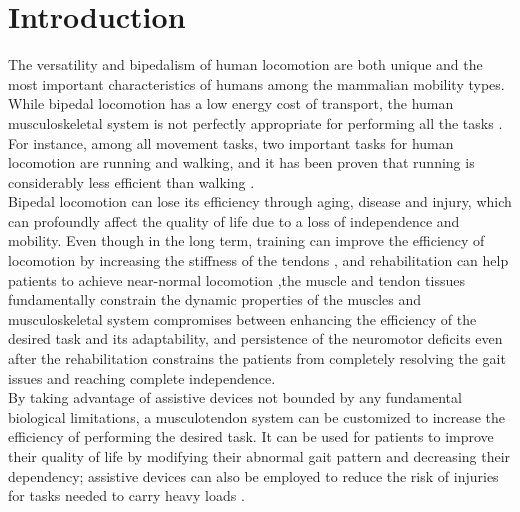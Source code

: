 \documentclass[10pt,letterpaper]{article}
\begin{document}
\section*{Introduction}
The versatility and bipedalism of human locomotion are both unique\cite{1} and the most important characteristics of humans among the mammalian mobility types. While bipedal locomotion has a low energy cost of transport\cite{1}, the human musculoskeletal system is not perfectly appropriate for performing all the tasks \cite{2}. For instance, among all movement tasks, two important tasks for human locomotion are running and walking, and it has been proven that running is considerably less efficient than walking \cite{3,4}.\\
Bipedal locomotion can lose its efficiency through aging, disease and injury, which can profoundly affect the quality of life \cite{7} due to a loss of independence and mobility. Even though in the long term, training can improve the efficiency of locomotion\cite{5} by increasing the stiffness of the tendons \cite{6}, and rehabilitation can help patients to achieve near-normal locomotion \cite{22},the muscle and tendon tissues fundamentally constrain the dynamic properties of the muscles and musculoskeletal system compromises between enhancing the efficiency of the desired task and its adaptability\cite{2}, and persistence of the neuromotor deficits even after the rehabilitation constrains \cite{22} the patients from completely resolving the gait issues and reaching complete independence.\\
By taking advantage of assistive devices not bounded by any fundamental biological limitations, a musculotendon system can be customized to increase the efficiency of performing the desired task. It can be used for patients to improve their quality of life by modifying their abnormal gait pattern and decreasing their dependency; assistive devices can also be employed to reduce the risk of injuries for tasks needed to carry heavy loads \cite{27,28,29}.\\
\end{document}
